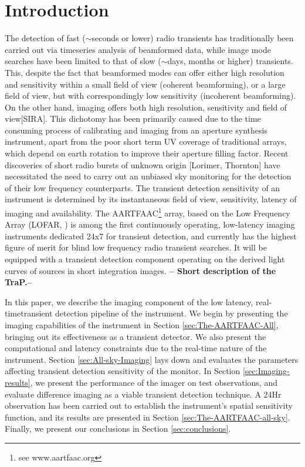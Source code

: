 \documentclass{aa}
\begin{document}
\maketitle

\section{\label{sec:Introduction}Introduction}
The   detection  of  fast   ($\sim$seconds  or   lower)  radio   transients  has
traditionally been carried out via timeseries analysis of beamformed data, while
image mode  searches have been  limited to that  of slow ($\sim$days,  months or
higher)  transients. This,  despite the  fact  that beamformed  modes can  offer
either high  resolution and sensitivity within  a small field  of view (coherent
beamforming), or a large field of view, but with correspondingly low sensitivity
(incoherent  beamforming).   On  the   other  hand,  imaging  offers  both  high
resolution,  sensitivity  and  field  of  view[SIRA]. This  dichotomy  has  been
primarily caused  due to the time  consuming process of  calibrating and imaging
from  an  aperture synthesis  instrument,  apart from  the  poor  short term  UV
coverage of traditional arrays, which  depend on earth rotation to improve their
aperture filling  factor.  Recent discoveries  of short radio bursts  of unknown
origin [Lorimer, Thornton]  have necessitated the need to  carry out an unbiased
sky  monitoring for  the detection  of  their low  frequency counterparts.   The
transient  detection   sensitivity  of  an  instrument  is   determined  by  its
instantaneous field  of view, sensitivity, latency of  imaging and availability.
The AARTFAAC\footnote{see  www.aartfaac.org} array,  based on the  Low Frequency
Array  (LOFAR, \citep{vanhaarlem2013lofar}  )  is among  the first  continuously
operating,  low-latency   imaging  instruments  dedicated   24x7  for  transient
detection, and currently has the highest figure of merit for blind low frequency
radio  transient  searches. It  will  be  equipped  with a  transient  detection
component operating on the derived  light curves of sources in short integration
images.  \textbf{-- Short description of the TraP.--}

In  this  paper,  we  describe   the  imaging  component  of  the  low  latency,
real-timetransient detection pipeline of the instrument.  We begin by presenting
the     imaging     capabilities     of     the    instrument     in     Section
\ref{sec:The-AARTFAAC-All},  bringing  out  its  effectiveness  as  a  transient
detector. We also  present the computational and latency  constraints due to the
real-time nature of the instrument.  Section \ref{sec:All-sky-Imaging} lays down
and evaluates  the parameters affecting  transient detection sensitivity  of the
monitor. In Section \ref{sec:Imaging-results}, we present the performance of the
imager  on  test observations,  and  evaluate  difference  imaging as  a  viable
transient  detection technique.   A 24Hr  observation  has been  carried out  to
establish  the instrument's spatial  sensitivity function,  and its  results are
presented  in Section  \ref{sec:The-AARTFAAC-all-sky}. Finally,  we  present our
conclusions in Section \ref{sec:conclusions}.
\end{document}
